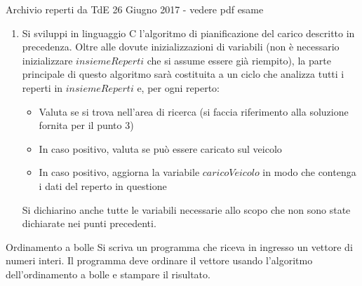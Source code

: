 \documentclass[aspectratio=169,]{beamer}
\begin{document}
\begin{frame}[allowframebreaks]{Archivio reperti da TdE 26 Giugno 2017 - vedere pdf esame}
\begin{enumerate}
        \item Si sviluppi in linguaggio C l’algoritmo di pianificazione del carico descritto in precedenza. Oltre alle
            dovute inizializzazioni di variabili (non è necessario inizializzare $insiemeReperti$ che si assume essere
            già riempito), la parte principale di questo algoritmo sarà costituita a un ciclo che analizza tutti i reperti in
            $insiemeReperti$ e, per ogni reperto:
            \begin{itemize}
                \item  Valuta se si trova nell'area di ricerca (si faccia riferimento alla soluzione fornita per il punto 3)
                \item  In caso positivo, valuta se può essere caricato sul veicolo
                \item  In caso positivo, aggiorna la variabile $caricoVeicolo$ in modo che contenga i dati del reperto in
                    questione
            \end{itemize}
            Si dichiarino anche tutte le variabili necessarie allo scopo che non sono state dichiarate nei punti precedenti.
    \end{enumerate}
\end{frame}

\begin{frame}{Ordinamento a bolle}
    Si scriva un programma che riceva in ingresso un vettore di numeri interi.
    Il programma deve ordinare il vettore usando l'algoritmo dell'ordinamento a bolle e stampare il risultato.
\end{frame}
\end{document}
